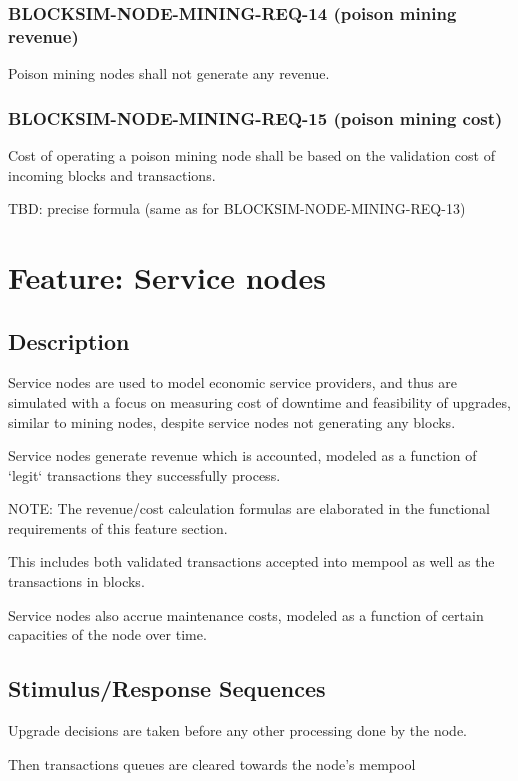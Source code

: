 \documentclass{scrreprt}
\begin{document}
\subsubsection{BLOCKSIM-NODE-MINING-REQ-14 (poison mining revenue)}

Poison mining nodes shall not generate any revenue.

\subsubsection{BLOCKSIM-NODE-MINING-REQ-15 (poison mining cost)}

Cost of operating a poison mining node shall be based on the validation
cost of incoming blocks and transactions.

TBD: precise formula (same as for BLOCKSIM-NODE-MINING-REQ-13)


\section{Feature: Service nodes}

\subsection{Description}

Service nodes are used to model economic service providers, and thus
are simulated with a focus on measuring cost of downtime and feasibility
of upgrades, similar to mining nodes, despite service nodes not generating
any blocks.

Service nodes generate revenue which is accounted, modeled as a function of
`legit` transactions they successfully process.

NOTE: The revenue/cost calculation formulas are elaborated in the functional
requirements of this feature section.

This includes both validated transactions accepted into mempool as well as
the transactions in blocks.

Service nodes also accrue maintenance costs, modeled as a function of certain
capacities of the node over time.


\subsection{Stimulus/Response Sequences}

Upgrade decisions are taken before any other processing done by the node.

Then transactions queues are cleared towards the node's mempool
\end{document}
